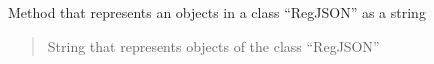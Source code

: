 \documentclass[letterpaper,10pt,english]{sphinxmanual}
\begin{document}
\begin{fulllineitems}
\begin{fulllineitems}
\label{\detokenize{db_classes:db_classes.RegJSON.__repr__}}
\pysigstartsignatures
{}
\pysigstopsignatures
\sphinxAtStartPar
Method that represents an objects in a class “RegJSON” as a string
\begin{quote}\begin{description}
\sphinxAtStartPar
{}

\sphinxAtStartPar
String that represents objects of the class “RegJSON”

\end{description}\end{quote}

\end{fulllineitems}


\end{fulllineitems}

\end{document}
